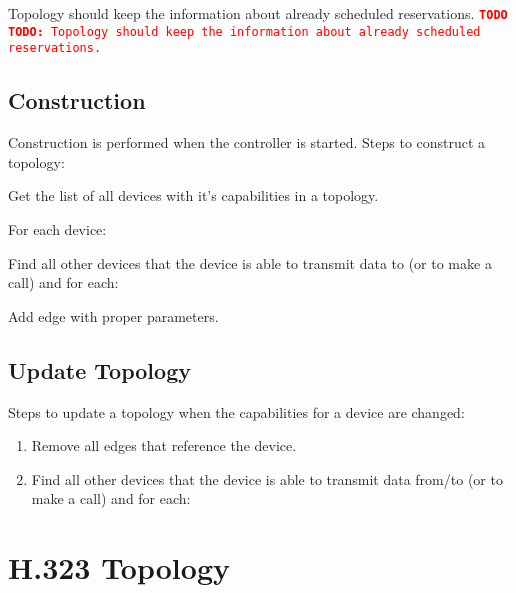 \documentclass[a4paper]{report}
\newcommand{\TODO}[1]{%
\def\empty{}%
\def\prvniparametr{#1}%
\ifx\prvniparametr\empty%
\begingroup\tt\textcolor{red}{\noindent\textbf{TODO}}\endgroup
\else%
\begingroup\tt\textcolor{red}{\noindent\textbf{TODO:}\ #1}\endgroup
\fi%
}
\begin{document}
\TODO{Topology should keep the information about already scheduled reservations.}
      
\subsection{Construction}

Construction is performed when the controller is started. Steps to construct a topology:

\begin{enumerate}

\item Get the list of all devices with it's capabilities in a topology.

\item For each device: 
  \begin{compactitem}
  \item Find all other devices that the device is able to transmit
  data to (or to make a call) and for each:
    \begin{compactitem}
    \item Add edge with proper parameters.
    \end{compactitem}
  \end{compactitem}

\end{enumerate}     

     
\subsection{Update Topology}     

Steps to update a topology when the capabilities for a device are changed:
\begin{enumerate}

\item Remove all edges that reference the device.

\item Find all other devices that the device is able to transmit data from/to
   (or to make a call) and for each:

\end{enumerate}  


\section{H.323 Topology}
\end{document}
